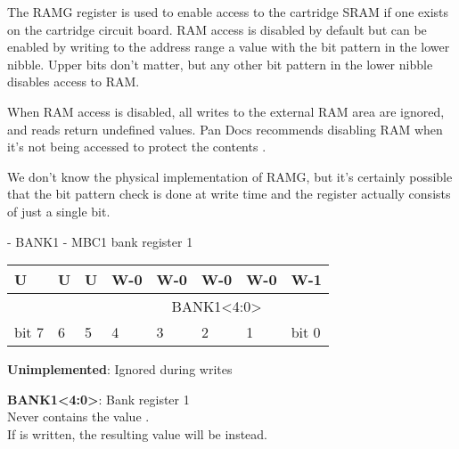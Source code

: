 \documentclass[\main/gbctr.tex]{subfiles}
\begin{document}
The RAMG register is used to enable access to the cartridge SRAM if one exists
on the cartridge circuit board. RAM access is disabled by default but can be
enabled by writing to the  address range a value with the
bit pattern  in the lower nibble. Upper bits don't matter, but any
other bit pattern in the lower nibble disables access to RAM.

When RAM access is disabled, all writes to the external RAM area
 are ignored, and reads return undefined values. Pan Docs
recommends disabling RAM when it's not being accessed to protect the contents
\cite{pandocs}.

\begin{speculation}
  We don't know the physical implementation of RAMG, but it's certainly
  possible that the  bit pattern check is done at write time and the
  register actually consists of just a single bit.
\end{speculation}

\begin{register}[H]
  \caption{ - BANK1 - MBC1 bank register 1}

  {
    \ttfamily
    \begin{tabularx}{\linewidth}{|X|X|X|X|X|X|X|X|}
      \hline
      U                     & U                     & U                     & W-0                                  & W-0 & W-0 & W-0 & W-1   \\
      \hline
      \cellcolor{LightGray} & \cellcolor{LightGray} & \cellcolor{LightGray} & \multicolumn{5}{c|}{BANK1<4:0>} \\
      \hline
      bit 7                 & 6                     & 5                     & 4                                    & 3   & 2   & 1   & bit 0 \\
      \hline
    \end{tabularx}{\parfillskip=0pt\par}
  }

  \begin{description}[leftmargin=5em, style=nextline]
    \item[bit 7-5]
      \textbf{Unimplemented}: Ignored during writes
    \item[bit 4-0]
      \textbf{BANK1<4:0>}: Bank register 1\\
      Never contains the value .\\
      If  is written, the resulting value will be  instead.
  \end{description}
\end{register}
\end{document}
